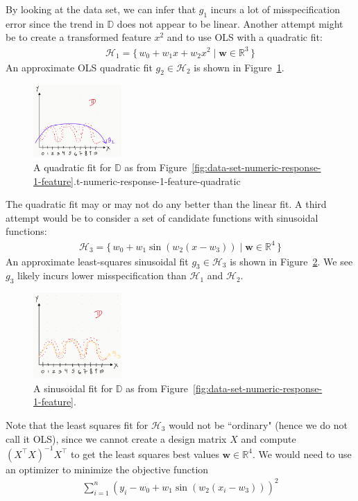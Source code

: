 \documentclass[12pt, a4paper]{article}
\theoremstyle{definition}
\begin{document}
	By looking at the data set, we can infer that $g_1$ incurs a lot of misspecification
	error since the trend in $\mathbb{D}$ does not appear to be linear.
	Another attempt might be to create a transformed feature $x^2$ and to
	use OLS with a quadratic fit:
	\begin{align*}
		\mathcal{H}_1 = \{\,
		w_0 + w_1 x + w_2 x^2 \mid \bm{w}\in \mathbb{R}^3
		\,\}
	\end{align*}
	An approximate OLS quadratic fit $g_2\in \mathcal{H}_2$ is shown in
	Figure~\ref{fig:data-set-numeric-response-1-feature-quadratic}.
	\begin{figure}
		\centering
		\includegraphics[width=0.3\textwidth]{data-set-numeric-response-1-feature-ols-quadratic}
		\caption{A quadratic fit for $\mathbb{D}$ as from Figure~\ref{fig:data-set-numeric-response-1-feature}.t-numeric-response-1-feature-quadratic}
		\label{fig:data-set-numeric-response-1-feature-quadratic}
	\end{figure}
	The quadratic fit may or may not do any better than the linear fit.
	A third attempt would be to consider a set of candidate functions with sinusoidal
	functions:
	\begin{align*}
		\mathcal{H}_3 = \{\,
		w_0 + w_1 \sin(w_2(x - w_3)) \mid \bm{w}\in \mathbb{R}^4
		\,\}
	\end{align*}
	An approximate least-squares sinusoidal fit $g_3\in \mathcal{H}_3$ is shown in
	Figure~\ref{fig:data-set-numeric-response-1-feature-sine}. We see $g_3$
	likely incurs lower misspecification than $\mathcal{H}_1$ and $\mathcal{H}_2$.
	\begin{figure}
		\centering
		\includegraphics[width=0.3\textwidth]{data-set-numeric-response-1-feature-ols-sine}
		\caption{A sinusoidal fit for $\mathbb{D}$ as from Figure~\ref{fig:data-set-numeric-response-1-feature}.}
		\label{fig:data-set-numeric-response-1-feature-sine}
	\end{figure}
	Note that the least squares fit for $\mathcal{H}_3$ would not be ``ordinary"
	(hence we do not call it OLS), since we cannot create a design matrix $X$
	and compute $(X^\top X)^{-1}X^\top$ to get the least squares best values
	$\bm{w}\in \mathbb{R}^4$. We would need to use an optimizer to minimize the
	objective function
	\begin{align*}
		\sum_{i=1}^{n}(y_i - w_0 + w_1\sin(w_2(x_i-w_3)))^2
	\end{align*}
	
\end{document}
